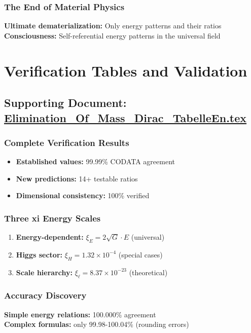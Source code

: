 \documentclass[12pt,a4paper]{report}
\begin{document}
	\subsubsection{The End of Material Physics}
	\textbf{Ultimate dematerialization:} Only energy patterns and their ratios\\
	\textbf{Consciousness:} Self-referential energy patterns in the universal field
	
	\section{Verification Tables and Validation}
	\subsection{Supporting Document: \href{https://github.com/jpascher/T0-Time-Mass-Duality/tree/main/2/pdf/Elimination_Of_Mass_Dirac_TabelleEn.pdf}{Elimination\_Of\_Mass\_Dirac\_TabelleEn.tex}}
	
	\subsubsection{Complete Verification Results}
	\begin{itemize}
		\item \textbf{Established values:} 99.99\% CODATA agreement
		\item \textbf{New predictions:} 14+ testable ratios
		\item \textbf{Dimensional consistency:} 100\% verified
	\end{itemize}
	
	\subsubsection{Three xi Energy Scales}
	\begin{enumerate}
		\item \textbf{Energy-dependent:} $\xi_E = 2\sqrt{G} \cdot E$ (universal)
		\item \textbf{Higgs sector:} $\xi_H = 1.32 \times 10^{-4}$ (special cases)
		\item \textbf{Scale hierarchy:} $\xi_\ell = 8.37 \times 10^{-23}$ (theoretical)
	\end{enumerate}
	
	\subsubsection{Accuracy Discovery}
	\textbf{Simple energy relations:} 100.000\% agreement\\
	\textbf{Complex formulas:} only 99.98-100.04\% (rounding errors)
	
\end{document}
